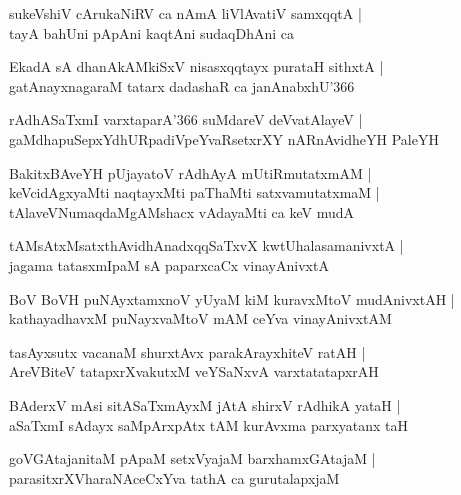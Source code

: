 \begin{shloka}
sukeVshiV cArukaNiRV ca nAmA liVlAvatiV samxqqtA |\\
tayA bahUni pApAni kaqtAni sudaqDhAni ca
\end{shloka}

\begin{shloka}
EkadA sA dhanAkAMkiSxV nisasxqqtayx purataH sithxtA |\\
gatAnayxnagaraM tatarx dadashaR ca janAnabxhU\char'366
\end{shloka}

\begin{shloka}
rAdhASaTxmI varxtaparA\char'366 suMdareV deVvatAlayeV |\\
gaMdhapuSepxYdhURpadiVpeYvaRsetxrXY nARnAvidheYH PaleYH
\end{shloka}

\begin{shloka}
BakitxBAveYH pUjayatoV rAdhAyA mUtiRmutatxmAM |\\
keVcidAgxyaMti naqtayxMti paThaMti satxvamutatxmaM |\\
tAlaveVNumaqdaMgAMshacx vAdayaMti ca keV mudA
\end{shloka}

\begin{shloka}
tAMsAtxMsatxthAvidhAnadxqqSaTxvX kwtUhalasamanivxtA |\\
jagama tatasxmIpaM sA paparxcaCx vinayAnivxtA
\end{shloka}

\begin{shloka}
BoV BoVH puNAyxtamxnoV yUyaM kiM kuravxMtoV mudAnivxtAH |\\
kathayadhavxM puNayxvaMtoV mAM ceYva vinayAnivxtAM
\end{shloka}

\begin{shloka}
tasAyxsutx vacanaM shurxtAvx parakArayxhiteV ratAH |\\
AreVBiteV tatapxrXvakutxM veYSaNxvA varxtatatapxrAH
\end{shloka}

\begin{shloka}
BAderxV mAsi sitASaTxmAyxM jAtA shirxV rAdhikA yataH |\\
aSaTxmI sAdayx saMpArxpAtx tAM kurAvxma parxyatanx taH
\end{shloka}

\begin{shloka}
goVGAtajanitaM pApaM setxVyajaM barxhamxGAtajaM |\\
parasitxrXVharaNAceCxYva tathA ca gurutalapxjaM
\end{shloka}

